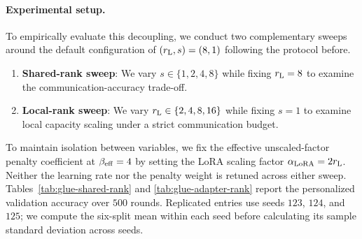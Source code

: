 \documentclass[11pt,letterpaper]{article}
\begin{document}
\paragraph{Experimental setup.}
To empirically evaluate this decoupling, we conduct two complementary sweeps around the default configuration of $(r_{\rm L},s)=(8,1)$ following the protocol before. 
\begin{enumerate}
    \item \textbf{Shared-rank sweep}: We vary $s \in \{1,2,4,8\}$ while fixing $r_{\rm L}=8$ to examine the communication-accuracy trade-off.
    \item \textbf{Local-rank sweep}: We vary $r_{\rm L} \in \{2,4,8,16\}$ while fixing $s=1$ to examine local capacity scaling under a strict communication budget.
\end{enumerate}
To maintain isolation between variables, we fix the effective unscaled-factor penalty coefficient at $\beta_{\rm eff}=4$ by setting the LoRA scaling factor $\alpha_{\rm LoRA}=2r_{\rm L}$. Neither the learning rate nor the penalty weight is retuned across either sweep. Tables~\ref{tab:glue-shared-rank} and \ref{tab:glue-adapter-rank} report the personalized validation accuracy over $500$ rounds. Replicated entries use seeds $123$, $124$, and $125$; we compute the six-split mean within each seed before calculating its sample standard deviation across seeds.
\end{document}
